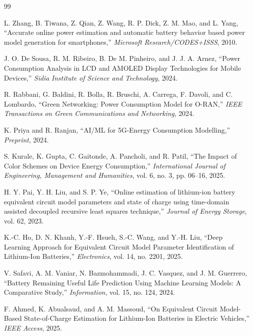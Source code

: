 \documentclass[12pt]{article}
\begin{document}
\begin{thebibliography}{99}

L. Zhang, B. Tiwana, Z. Qian, Z. Wang, R. P. Dick, Z. M. Mao, and L. Yang, ``Accurate online power estimation and automatic battery behavior based power model generation for smartphones,'' \textit{Microsoft Research/CODES+ISSS}, 2010.

J. O. De Sousa, R. M. Ribeiro, B. De M. Pinheiro, and J. J. A. Arnez, ``Power Consumption Analysis in LCD and AMOLED Display Technologies for Mobile Devices,'' \textit{Sidia Institute of Science and Technology}, 2024.

R. Rabbani, G. Baldini, R. Bolla, R. Bruschi, A. Carrega, F. Davoli, and C. Lombardo, ``Green Networking: Power Consumption Model for O-RAN,'' \textit{IEEE Transactions on Green Communications and Networking}, 2024.

K. Priya and R. Ranjan, ``AI/ML for 5G-Energy Consumption Modelling,'' \textit{Preprint}, 2024.

S. Kurale, K. Gupta, C. Gaitonde, A. Pancholi, and R. Patil, ``The Impact of Color Schemes on Device Energy Consumption,'' \textit{International Journal of Engineering, Management and Humanities}, vol. 6, no. 3, pp. 06--16, 2025.

H. Y. Pai, Y. H. Liu, and S. P. Ye, ``Online estimation of lithium-ion battery equivalent circuit model parameters and state of charge using time-domain assisted decoupled recursive least squares technique,'' \textit{Journal of Energy Storage}, vol. 62, 2023.

K.-C. Ho, D. N. Khanh, Y.-F. Hsueh, S.-C. Wang, and Y.-H. Liu, ``Deep Learning Approach for Equivalent Circuit Model Parameter Identification of Lithium-Ion Batteries,'' \textit{Electronics}, vol. 14, no. 2201, 2025.

V. Safavi, A. M. Vaniar, N. Bazmohammadi, J. C. Vasquez, and J. M. Guerrero, ``Battery Remaining Useful Life Prediction Using Machine Learning Models: A Comparative Study,'' \textit{Information}, vol. 15, no. 124, 2024.

F. Ahmed, K. Abualsaud, and A. M. Massoud, ``On Equivalent Circuit Model-Based State-of-Charge Estimation for Lithium-Ion Batteries in Electric Vehicles,'' \textit{IEEE Access}, 2025.


\end{thebibliography}
\end{document}
